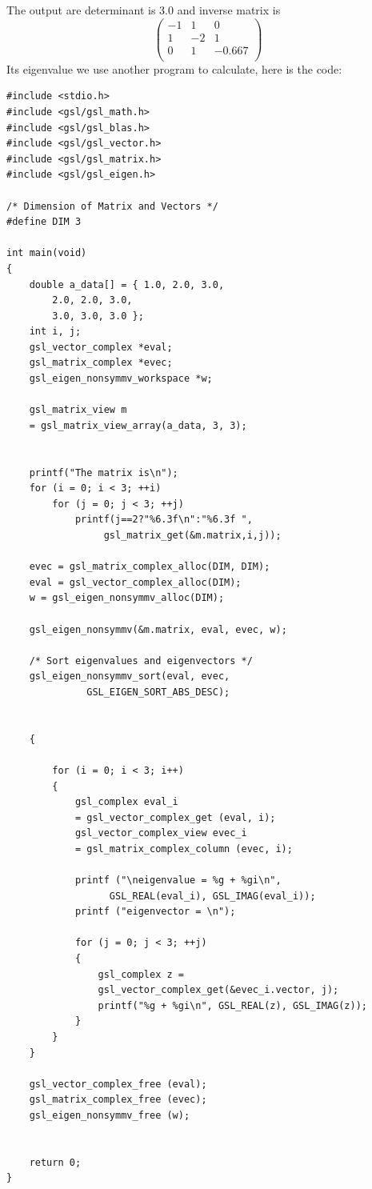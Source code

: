 \documentclass{article}
\begin{document}
The output are determinant is 3.0 and inverse matrix is
\begin{equation}       %
\left(                 %
  \begin{array}{ccc}   %
    -1 & 1 & 0\\  %
    1 & -2 & 1\\  %
    0 & 1 & -0.667\\
  \end{array}
\right)                 %
\end{equation}
Its eigenvalue we use another program to calculate, here is the code:
\begin{lstlisting}
#include <stdio.h>
#include <gsl/gsl_math.h>
#include <gsl/gsl_blas.h>
#include <gsl/gsl_vector.h>
#include <gsl/gsl_matrix.h>
#include <gsl/gsl_eigen.h>

/* Dimension of Matrix and Vectors */
#define DIM 3

int main(void)
{
    double a_data[] = { 1.0, 2.0, 3.0,
        2.0, 2.0, 3.0,
        3.0, 3.0, 3.0 };
    int i, j;
    gsl_vector_complex *eval;
    gsl_matrix_complex *evec;
    gsl_eigen_nonsymmv_workspace *w;
    
    gsl_matrix_view m
    = gsl_matrix_view_array(a_data, 3, 3);
    
    
    printf("The matrix is\n");
    for (i = 0; i < 3; ++i)
        for (j = 0; j < 3; ++j)
            printf(j==2?"%6.3f\n":"%6.3f ", 
                 gsl_matrix_get(&m.matrix,i,j));
  
    evec = gsl_matrix_complex_alloc(DIM, DIM);
    eval = gsl_vector_complex_alloc(DIM);
    w = gsl_eigen_nonsymmv_alloc(DIM);
    
    gsl_eigen_nonsymmv(&m.matrix, eval, evec, w);
    
    /* Sort eigenvalues and eigenvectors */
    gsl_eigen_nonsymmv_sort(eval, evec, 
              GSL_EIGEN_SORT_ABS_DESC);
    
    
    {
        
        for (i = 0; i < 3; i++)
        {
            gsl_complex eval_i
            = gsl_vector_complex_get (eval, i);
            gsl_vector_complex_view evec_i
            = gsl_matrix_complex_column (evec, i);
            
            printf ("\neigenvalue = %g + %gi\n", 
                  GSL_REAL(eval_i), GSL_IMAG(eval_i));
            printf ("eigenvector = \n");
            
            for (j = 0; j < 3; ++j)
            {
                gsl_complex z =
                gsl_vector_complex_get(&evec_i.vector, j);
                printf("%g + %gi\n", GSL_REAL(z), GSL_IMAG(z));
            }
        }
    }
    
    gsl_vector_complex_free (eval);
    gsl_matrix_complex_free (evec);
    gsl_eigen_nonsymmv_free (w);
    
    
    return 0;
}
\end{lstlisting}
\end{document}
